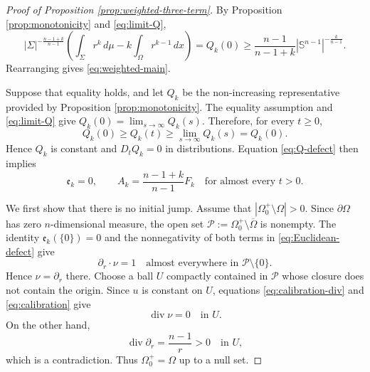 \documentclass[11pt,reqno]{amsart}
\numberwithin{equation}{section}
\theoremstyle{definition}
\newcommand{\Sn}{\mathbb S}
\newcommand{\Om}{\Omega}
\newcommand{\Sig}{\Sigma}
\newcommand{\diver}{\operatorname{div}}
\begin{document}
\begin{proof}[Proof of Proposition \ref{prop:weighted-three-term}]
By Proposition \ref{prop:monotonicity} and \eqref{eq:limit-Q},
\begin{equation*}
    |\Sig|^{-\frac{n-1+k}{n-1}}
    \left(\int_\Sig r^k\,d\mu-k\int_\Om r^{k-1}\,dx\right)
    =Q_k(0)
    \geq
    \frac{n-1}{n-1+k}|\Sn^{n-1}|^{-\frac{k}{n-1}}.
\end{equation*}
Rearranging gives \eqref{eq:weighted-main}.

Suppose that equality holds, and let $Q_k$ be the non-increasing
representative provided by Proposition \ref{prop:monotonicity}. The
equality assumption and \eqref{eq:limit-Q} give $Q_k(0)=\lim_{s\to\infty}Q_k(s)$.
Therefore, for every $t\geq0$,
\begin{equation*}
    Q_k(0)\geq Q_k(t)\geq
    \lim_{s\to\infty}Q_k(s)=Q_k(0).
\end{equation*}
Hence $Q_k$ is constant and $D_tQ_k=0$ in distributions. Equation \eqref{eq:Q-defect} then implies
\begin{equation}\label{eq:equality-defects-zero}
    \mathfrak e_k=0,
    \qquad
    A_k=\frac{n-1+k}{n-1} F_k
    \quad\text{for almost every }t>0.
\end{equation}

We first show that there is no initial jump.  Assume that $  |\Om_0^+\setminus\Om|>0$.  Since $\partial\Om$ has zero $n$-dimensional measure, the open set $ \mathcal P:=\Om_0^+\setminus\overline\Om$ is nonempty.  The identity $\mathfrak e_k(\{0\})=0$ and the nonnegativity of both terms in \eqref{eq:Euclidean-defect} give
\begin{equation*}
    \partial_r\cdot\nu=1
    \quad\text{almost everywhere in }\mathcal P\setminus\{0\}.
\end{equation*}
Hence $\nu=\partial_r$ there.  Choose a ball $U$ compactly contained in $\mathcal P$ whose closure does not contain the origin.  Since $u$ is constant on $U$, equations \eqref{eq:calibration-div} and \eqref{eq:calibration} give
\begin{equation*}
    \diver\nu=0
    \quad\text{in }U.
\end{equation*}
On the other hand,
\begin{equation*}
    \diver \partial_r=\frac{n-1}{r}>0
    \quad\text{in }U,
\end{equation*}
which is a contradiction.  Thus $\Om_0^+=\Om$ up to a null set.


\end{proof}
\end{document}

